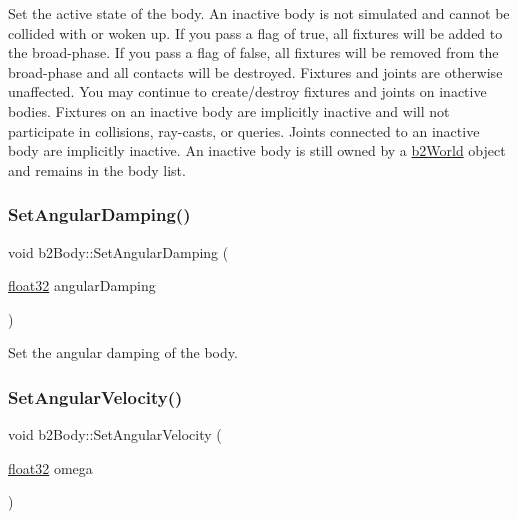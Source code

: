 Set the active state of the body. An inactive body is not simulated and cannot be collided with or woken up. If you pass a flag of true, all fixtures will be added to the broad-\/phase. If you pass a flag of false, all fixtures will be removed from the broad-\/phase and all contacts will be destroyed. Fixtures and joints are otherwise unaffected. You may continue to create/destroy fixtures and joints on inactive bodies. Fixtures on an inactive body are implicitly inactive and will not participate in collisions, ray-\/casts, or queries. Joints connected to an inactive body are implicitly inactive. An inactive body is still owned by a \mbox{\hyperlink{classb2_world}{b2\+World}} object and remains in the body list. \mbox{\label{classb2_body_a73a79541b18394fa224d2eae8ad493e8}} 
\subsubsection{\texorpdfstring{SetAngularDamping()}{SetAngularDamping()}}
{\footnotesize\ttfamily void b2\+Body\+::\+Set\+Angular\+Damping (\begin{DoxyParamCaption}\item[{\mbox{\hyperlink{b2_settings_8h_aacdc525d6f7bddb3ae95d5c311bd06a1}{float32}}}]{angular\+Damping }\end{DoxyParamCaption})\hspace{0.3cm}{\ttfamily [inline]}}



Set the angular damping of the body. 

\mbox{\label{classb2_body_a37adc4160b84f73e8552a91cbde3f578}} 
\subsubsection{\texorpdfstring{SetAngularVelocity()}{SetAngularVelocity()}}
{\footnotesize\ttfamily void b2\+Body\+::\+Set\+Angular\+Velocity (\begin{DoxyParamCaption}\item[{\mbox{\hyperlink{b2_settings_8h_aacdc525d6f7bddb3ae95d5c311bd06a1}{float32}}}]{omega }\end{DoxyParamCaption})\hspace{0.3cm}{\ttfamily [inline]}}

